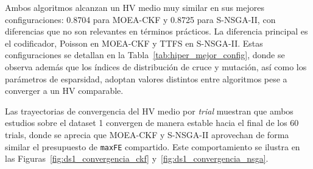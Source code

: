Ambos algoritmos alcanzan un HV medio muy similar en sus mejores configuraciones: 0.8704 para MOEA-CKF y 0.8725 para S-NSGA-II, con diferencias que no son relevantes en términos prácticos. La diferencia principal es el codificador, Poisson en MOEA-CKF y TTFS en S-NSGA-II. Estas configuraciones se detallan en la Tabla~\ref{tab:hiper_mejor_config}, donde se observa además que los índices de distribución de cruce y mutación, así como los parámetros de esparsidad, adoptan valores distintos entre algoritmos pese a converger a un HV comparable.

\begin{table}[htbp]
    \centering
    \small
    \caption{Hiperparámetros de la mejor configuración por algoritmo y dataset.}
    \label{tab:hiper_mejor_config}
\end{table}

Las trayectorias de convergencia del HV medio por \emph{trial} muestran que ambos estudios sobre el dataset 1 convergen de manera estable hacia el final de los 60 trials, donde se aprecia que MOEA-CKF y S-NSGA-II aprovechan de forma similar el presupuesto de \texttt{maxFE} compartido. Este comportamiento se ilustra en las Figuras~\ref{fig:ds1_convergencia_ckf} y~\ref{fig:ds1_convergencia_nsga}.

